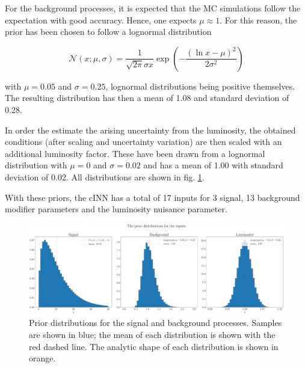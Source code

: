For the background processes, it is expected that the MC simulations follow the expectation with good accuracy. Hence, one expects $\mu \approx 1$. For this reason, the prior has been chosen to follow a lognormal distribution

\begin{equation*}
	\mathcal{N}(x; \mu, \sigma) = \frac{1}{\sqrt{2\pi }\sigma x}\exp\left(-\frac{\left(\ln x-\mu\right)^2}{2\sigma^2}\right)
\end{equation*}

with $\mu = 0.05$ and $\sigma = 0.25$, lognormal distributions being positive themselves. The resulting distribution has then a mean of 1.08 and standard deviation of 0.28.

In order the estimate the arising uncertainty from the luminosity, the obtained conditions (after scaling and uncertainty variation) are then scaled with an additional luminosity factor. These have been drawn from a lognormal distribution with $\mu = 0$ and $\sigma = 0.02$ and has a mean of 1.00 with standard deviation of 0.02. All distributions are shown in fig. \ref{fig:priors}.

With these priors, the cINN has a total of 17 inputs for 3 signal, 13 background modifier parameters and the luminosity nuisance parameter.

\begin{figure}[h!]
	\centering
	\includegraphics[width=\linewidth]{figures/network_setup/priors.pdf}
	\caption{Prior distributions for the signal and background processes. Samples are shown in blue; the mean of each distribution is shown with the red dashed line. The analytic shape of each distribution is shown in orange.}
	\label{fig:priors}
\end{figure}

